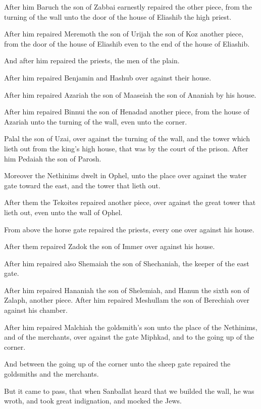 \Verse After him Baruch the son of Zabbai earnestly repaired the other piece, from the turning of the wall unto the door of the house of Eliashib the high priest.

\Verse After him repaired Meremoth the son of Urijah the son of Koz another piece, from the door of the house of Eliashib even to the end of the house of Eliashib.

\Verse And after him repaired the priests, the men of the plain.

\Verse After him repaired Benjamin and Hashub over against their house.

After him repaired Azariah the son of Maaseiah the son of Ananiah by his house.

\Verse After him repaired Binnui the son of Henadad another piece, from the house of Azariah unto the turning of the wall, even unto the corner.

\Verse Palal the son of Uzai, over against the turning of the wall, and the tower which lieth out from the king's high house, that was by the court of the prison. After him Pedaiah the son of Parosh.

\Verse Moreover the Nethinims dwelt in Ophel, unto the place over against the water gate toward the east, and the tower that lieth out.

\Verse After them the Tekoites repaired another piece, over against the great tower that lieth out, even unto the wall of Ophel.

\Verse From above the horse gate repaired the priests, every one over against his house.

\Verse After them repaired Zadok the son of Immer over against his house.

After him repaired also Shemaiah the son of Shechaniah, the keeper of the east gate.

\Verse After him repaired Hananiah the son of Shelemiah, and Hanun the sixth son of Zalaph, another piece. After him repaired Meshullam the son of Berechiah over against his chamber.

\Verse After him repaired Malchiah the goldsmith's son unto the place of the Nethinims, and of the merchants, over against the gate Miphkad, and to the going up of the corner.

\Verse And between the going up of the corner unto the sheep gate repaired the goldsmiths and the merchants.


\Chapter
\Verse But it came to pass, that when Sanballat heard that we builded the wall, he was wroth, and took great indignation, and mocked the Jews.

